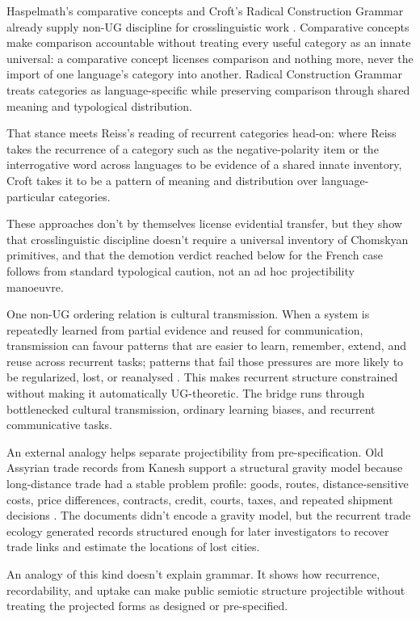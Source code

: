 \documentclass[12pt]{article}
\begin{document}
Haspelmath's comparative concepts and Croft's Radical Construction Grammar already supply non-UG discipline for crosslinguistic work \citep{haspelmath2010,croft2001}. Comparative concepts make comparison accountable without treating every useful category as an innate universal: a comparative concept licenses comparison and nothing more, never the import of one language's category into another. Radical Construction Grammar treats categories as language-specific while preserving comparison through shared meaning and typological distribution.

That stance meets Reiss's reading of recurrent categories head-on: where Reiss takes the recurrence of a category such as the negative-polarity item or the interrogative word across languages to be evidence of a shared innate inventory, Croft takes it to be a pattern of meaning and distribution over language-particular categories.

These approaches don't by themselves license evidential transfer, but they show that crosslinguistic discipline doesn't require a universal inventory of Chomskyan primitives, and that the demotion verdict reached below for the French  case follows from standard typological caution, not an ad hoc projectibility manoeuvre.

One non-UG ordering relation is cultural transmission. When a system is repeatedly learned from partial evidence and reused for communication, transmission can favour patterns that are easier to learn, remember, extend, and reuse across recurrent tasks; patterns that fail those pressures are more likely to be regularized, lost, or reanalysed \citep{kirby2008,kirby2015compression,kirby2014}. This makes recurrent structure constrained without making it automatically UG-theoretic. The bridge runs through bottlenecked cultural transmission, ordinary learning biases, and recurrent communicative tasks.

An external analogy helps separate projectibility from pre-specification. Old Assyrian trade records from Kanesh support a structural gravity model because long-distance trade had a stable problem profile: goods, routes, distance-sensitive costs, price differences, contracts, credit, courts, taxes, and repeated shipment decisions \citep{barjamovic2019trade}. The documents didn't encode a gravity model, but the recurrent trade ecology generated records structured enough for later investigators to recover trade links and estimate the locations of lost cities.

An analogy of this kind doesn't explain grammar. It shows how recurrence, recordability, and uptake can make public semiotic structure projectible without treating the projected forms as designed or pre-specified.
\end{document}
